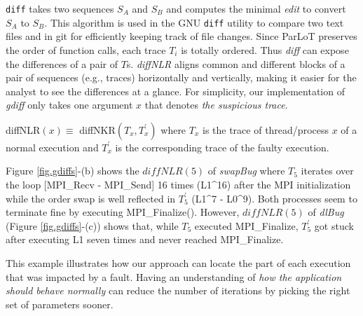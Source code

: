\texttt{diff} takes two sequences $S_A$ and $S_B$ and computes the minimal \textit{edit} to convert $S_A$ to $S_B$. This algorithm is used in the GNU \texttt{diff} utility to compare two text files and in git for efficiently keeping track of file changes.
Since ParLoT preserves the order of function calls, each trace $T_i$ is totally ordered. Thus \textit{diff} can expose the differences of a pair of $T$s. \textit{diffNLR} aligns common and different blocks of a pair of sequences (e.g., traces) horizontally and vertically, making it easier for the analyst to see the differences at a glance.
For simplicity, our implementation of \textit{gdiff} only takes one argument $x$ that denotes \textit{the suspicious trace}.

diffNLR$(x) \equiv $ diffNKR$(T_x,T_x^\prime)$
%
where $T_x$ is the trace of thread/process $x$ of a normal execution and $T^\prime_x$ is the corresponding trace of the faulty execution.

Figure \ref{fig.gdiffs}-(b) shows the $diffNLR(5)$ of \textit{swapBug} where $T_5$ iterates over the loop [MPI\_Recv - MPI\_Send] 16 times (L1\^{}16) after the MPI initialization while the order swap is well reflected in $T_5^\prime$ (L1\^{}7 - L0\^{}9). Both processes seem to terminate fine by executing MPI\_Finalize(). 
However, $diffNLR(5)$ of \textit{dlBug} (Figure \ref{fig.gdiffs}-(c)) shows that, while $T_5$ executed MPI\_Finalize, $T_5^\prime$ got stuck after executing L1 seven times and never reached MPI\_Finalize.

This example illustrates how our approach can locate the part of each execution that was impacted by a fault. Having an understanding of \textit{how the application should behave normally} can reduce the number of iterations by picking the right set of parameters sooner. 








